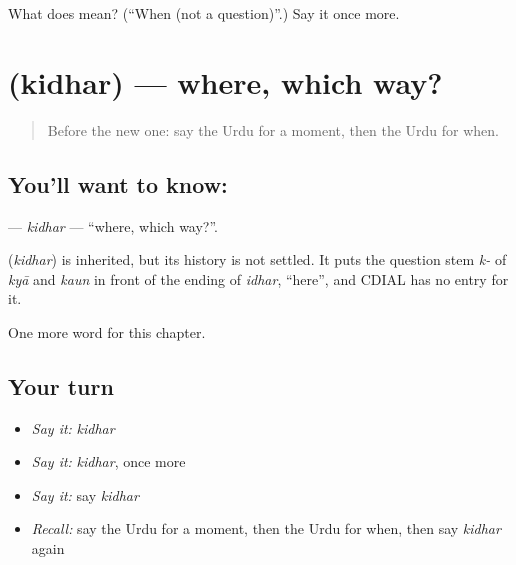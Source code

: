 \begin{tcolorbox}[breakable,colback=teal!4,colframe=teal!35!black,title={Before you move on}]
What does  mean? (\textquotedblleft{}When (not a question)\textquotedblright{}.) Say it once more.
\end{tcolorbox}
\section[\texorpdfstring{\ur{کدھر} (kidhar)}{کدھر (kidhar)}]{ (kidhar) — where, which way?}

\label{lesson:UR-C96-kidhar}



\begin{quote}
Before the new one: say the Urdu for a moment, then the Urdu for when.
\end{quote}

\subsection*{You'll want to know: }
\textbf{} — \emph{kidhar} — \textquotedblleft{}where, which way?\textquotedblright{}.

\begin{cousinweb}
\textbf{} (\emph{kidhar}) is inherited, but its history is not settled. It puts the question stem \emph{k-} of \emph{kyā} and \emph{kaun} in front of the ending of \emph{idhar}, \textquotedblleft{}here\textquotedblright{}, and CDIAL has no entry for it.
\end{cousinweb}

\begin{grammarlens}[title={What you've built}]
One more word for this chapter.
\end{grammarlens}

\subsection*{Your turn}
\begin{itemize}
\raggedright
  \item \emph{Say it:} \emph{kidhar}
  \item \emph{Say it:} \emph{kidhar}, once more
  \item \emph{Say it:} say \emph{kidhar}
  \item \emph{Recall:} say the Urdu for a moment, then the Urdu for when, then say \emph{kidhar} again
\end{itemize}

